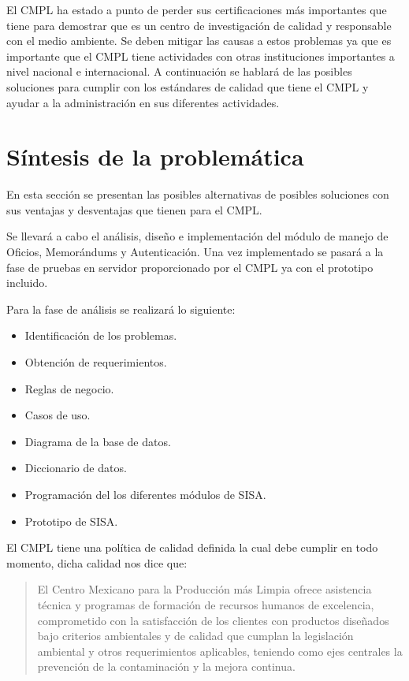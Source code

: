 El CMPL ha estado a punto de perder sus certificaciones más importantes que tiene para demostrar que es un centro de investigación de calidad y responsable con el medio ambiente. Se deben mitigar las causas a estos problemas ya que es importante que el CMPL tiene actividades con otras instituciones importantes a nivel nacional e internacional. A continuación se hablará de las posibles soluciones para cumplir con los estándares de calidad que tiene el CMPL y ayudar a la administración en sus diferentes actividades. 

\section{Síntesis de la problemática}

En esta sección se presentan las posibles alternativas de posibles soluciones con sus ventajas y desventajas que tienen para el CMPL.



Se llevará a cabo el análisis, diseño e implementación del módulo de manejo de Oficios, Memorándums y Autenticación. Una vez implementado se pasará a la fase de pruebas en servidor proporcionado por el CMPL ya con el prototipo incluido.

Para la fase de análisis se realizará lo siguiente:
\begin{itemize}
	\item Identificación de los problemas.
	\item Obtención de requerimientos.
	\item Reglas de negocio.
	\item Casos de uso.
	\item Diagrama de la base de datos.
	\item Diccionario de datos.
	\item Programación del los diferentes módulos de SISA.
	\item Prototipo de SISA.
\end{itemize}

El CMPL tiene una política de calidad definida la cual debe cumplir en todo momento, dicha calidad nos dice que:
\begin{quotation}
El Centro Mexicano para la Producción más Limpia ofrece asistencia técnica y programas de formación de recursos humanos de excelencia, comprometido con la satisfacción de los clientes con productos diseñados bajo criterios ambientales y de calidad que cumplan la legislación ambiental y otros requerimientos aplicables, teniendo como ejes centrales la prevención de la contaminación y la mejora continua.
\end{quotation}




